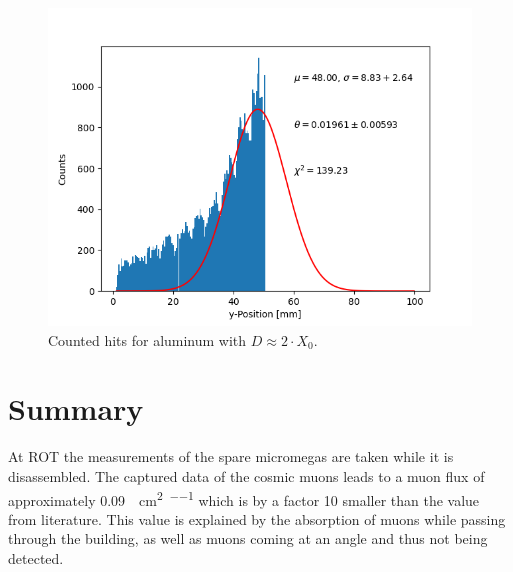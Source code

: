 \documentclass[sn-mathphys-num,iicol]{sn-jnl}
\theoremstyle{thmstyleone}
\theoremstyle{thmstyletwo}
\theoremstyle{thmstylethree}
\begin{document}
\begin{figure}
  \includegraphics[width=0.9\linewidth]{../src/elsa/finished_plots/Aluminium, Two Radiation Lengths, 40cm Distance.png}
  \caption{Counted hits for aluminum with $D\approx2\cdot X_0$.}
  \label{fig:2alu}
\end{figure}








\section{Summary}
At ROT the measurements of the spare micromegas are taken while it is disassembled.
The captured data of the cosmic muons leads to a muon flux of approximately \SI{.09}{\per\centi\meter\squared\per\min} which is by a factor 10 smaller than the value from literature.
This value is explained by the absorption of muons while passing through the building, as well as muons coming at an angle and thus not being detected.
\end{document}
